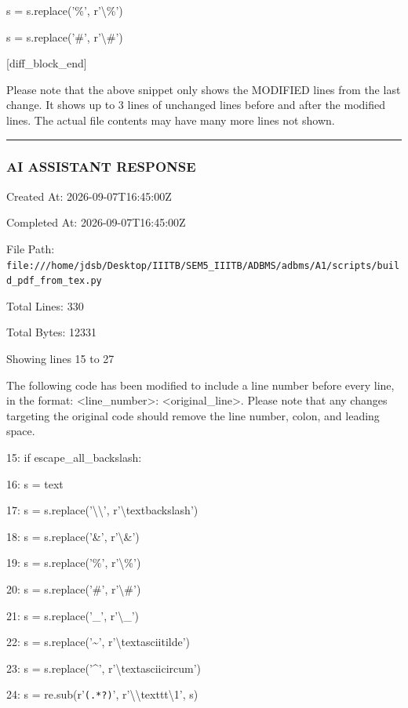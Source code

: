 \documentclass[11pt,a4paper]{article}
\begin{document}
s = s.replace('\%', r'\textbackslash{}\%')

s = s.replace('\#', r'\textbackslash{}\#')

[diff\_block\_end]


Please note that the above snippet only shows the MODIFIED lines from the last change. It shows up to 3 lines of unchanged lines before and after the modified lines. The actual file contents may have many more lines not shown.


\hrule

\subsubsection{AI ASSISTANT RESPONSE}

Created At: 2026-09-07T16:45:00Z

Completed At: 2026-09-07T16:45:00Z

File Path: \texttt{file:///home/jdsb/Desktop/IIITB/SEM5\_IIITB/ADBMS/adbms/A1/scripts/build\_pdf\_from\_tex.py}

Total Lines: 330

Total Bytes: 12331

Showing lines 15 to 27

The following code has been modified to include a line number before every line, in the format: <line\_number>: <original\_line>. Please note that any changes targeting the original code should remove the line number, colon, and leading space.

15:     if escape\_all\_backslash:

16:         s = text

17:         s = s.replace('\textbackslash{}\textbackslash{}', r'\textbackslash{}textbackslash{}')

18:         s = s.replace('\&', r'\textbackslash{}\&')

19:         s = s.replace('\%', r'\textbackslash{}\%')

20:         s = s.replace('\#', r'\textbackslash{}\#')

21:         s = s.replace('\_', r'\textbackslash{}\_')

22:         s = s.replace('\textasciitilde{}', r'\textbackslash{}textasciitilde{}')

23:         s = s.replace('\textasciicircum{}', r'\textbackslash{}textasciicircum{}')

24:         s = re.sub(r'\texttt{(.*?)}', r'\textbackslash{}\textbackslash{}texttt{\textbackslash{}1}', s)
\end{document}
